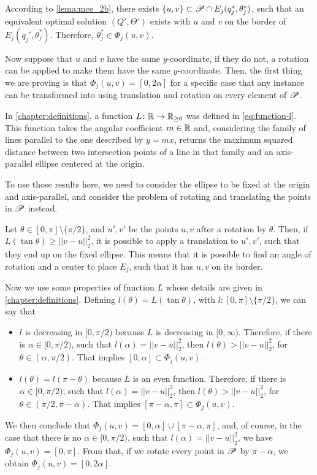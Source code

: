 \begin{pf}
	According to \autoref{lema:mce_2b}, there exists $\{u, v\} \subset \mathscr{P} \cap E_j(q^*_j, \theta^*_j)$, such that an equivalent optimal solution $(Q', \Theta')$ exists with $u$ and $v$ on the border of $E_j(q_j', \theta_j^*)$. Therefore, $\theta_j^*\in\Phi_j(u,v)$.
	
	Now suppose that $u$ and $v$ have the same $y$-coordinate, if they do not, a rotation can be applied to make them have the same $y$-coordinate. Then, the first thing we are proving is that $\Phi_j(u, v) = [0, 2\alpha]$ for a specific case that any instance can be transformed into using translation and rotation on every element of $\mathscr{P}$.
	
	In \autoref{chapter:definitions}, a function $L\colon \mathbb{R} \to \mathbb{R}_{\ge0}$ was defined in \autoref{eq:function-l}. This function takes the angular coefficient $m\in\mathbb{R}$ and, considering the family of lines parallel to the one described by $y=mx$, returns the maximum squared distance between two intersection points of a line in that family and an axis-parallel ellipse centered at the origin.
	
	To use those results here, we need to consider the ellipse to be fixed at the origin and axis-parallel, and consider the problem of rotating and translating the points in $\mathscr{P}$ instead. 
	
	Let $\theta \in [0, \pi]\setminus\{\pi/2\}$, and $u', v'$ be the points $u, v$ after a rotation by $\theta$. Then, if $L(\tan{\theta}) \ge ||v-u||_2^2$, it is possible to apply a translation to $u',v'$, such that they end up on the fixed ellipse. This means that it is possible to find an angle of rotation and a center to place $E_j$, such that it has $u, v$ on its border. 
	
	Now we use some properties of function $L$ whose details are given in \autoref{chapter:definitions}.
	Defining $l(\theta)=L(\tan{\theta})$, with $l:[0, \pi]\setminus\{\pi/2\}$, we can say that
	
	\begin{itemize}
		\item $l$ is decreasing in $[0, \pi/2)$ because $L$ is decreasing in $[0, \infty)$. Therefore, if there is $\alpha\in[0, \pi/2)$, such that $l(\alpha) = ||v-u||_2^2$, then $l(\theta)>||v-u||_2^2$, for $\theta\in(\alpha, \pi/2)$. That implies $[0, \alpha] \subset \Phi_j(u,v)$.
		\item $l(\theta) = l(\pi-\theta)$ because $L$ is an even function. Therefore, if there is $\alpha\in[0, \pi/2)$, such that $l(\alpha) = ||v-u||_2^2$, then $l(\theta)>||v-u||_2^2$, for $\theta\in(\pi/2,\pi-\alpha)$. That implies $[\pi-\alpha, \pi] \subset \Phi_j(u,v)$.
	\end{itemize}
	We then conclude that $\Phi_j(u, v) = [0, \alpha]\cup [\pi-\alpha, \pi]$, and, of course, in the case that there is no $\alpha\in[0, \pi/2)$, such that $l(\alpha)=||v-u||_2^2$, we have $\Phi_j(u,v)=[0, \pi]$.
	From that, if we rotate every point in $\mathscr{P}$ by $\pi-\alpha$, we obtain $\Phi_j(u,v)=[0, 2\alpha]$.
	

\end{pf}

